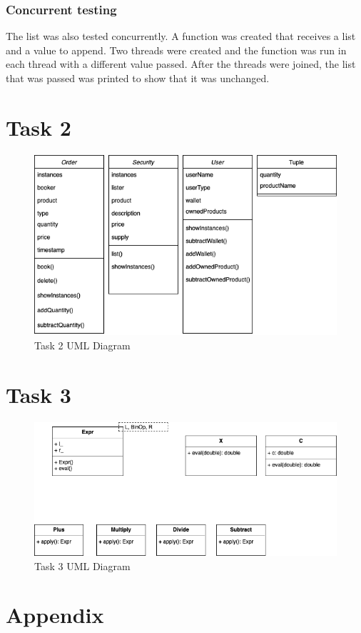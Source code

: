 \documentclass[a4paper, 12pt]{report}
\begin{document}
\subsubsection{Concurrent testing}
The list was also tested concurrently. A function was created that receives a list and a value to append. Two threads were created and the function was run in each thread with a different value passed. After the threads were joined, the list that was passed was printed to show that it was unchanged.

\section{Task 2}

\begin{figure}[H]
    \centering
    \includegraphics[width=1\textwidth]{"UML 2"}
    \caption{Task 2 UML Diagram}
\end{figure}

\section{Task 3}

\begin{figure}[H]
    \centering
    \includegraphics[width=1\textwidth]{"UML 3"}
    \caption{Task 3 UML Diagram}
\end{figure}
\section{Appendix}
\end{document}
